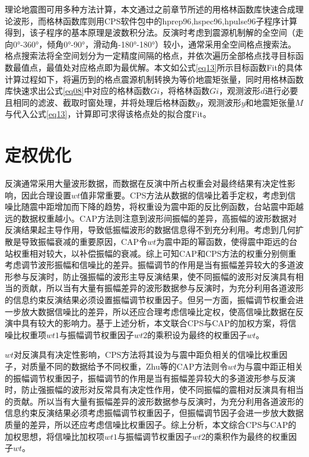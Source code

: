 理论地震图可用多种方法计算，本文通过之前章节所述的用格林函数库快速合成理论波形，而格林函数库则用CPS软件包中的hprep96,hspec96,hpulse96子程序计算得到，该子程序的基本原理是波数积分法。反演时考虑到震源机制解的全空间（走向0°-360°，倾角0°-90°，滑动角-180°-180°）较小，通常采用全空间格点搜索法。
格点搜索法将全空间划分为一定精度间隔的格点，并依次遍历全部格点找寻目标函数最值点，最值处对应格点即为最优解。本文如公式\ref{eq13}所示目标函数Fit的具体计算过程如下，将遍历到的格点震源机制转换为等价地震矩张量\citep{Jost1989}，同时用格林函数库快速求出公式\ref{eq08}中对应的格林函数$Gi$，将格林函数$Gi$，观测波形$d$进行必要且相同的滤波、截取时窗处理，并将处理后格林函数$g$，观测波形$y$和地震矩张量$M$与代入公式\ref{eq13}，计算即可求得该格点处的拟合度Fit。

\section{定权优化}
\label{sec:first}

反演通常采用大量波形数据，而数据在反演中所占权重会对最终结果有决定性影响，因此合理设置$wt$值非常重要。CPS方法从数据的信噪比着手定权，考虑到信噪比随震中距增加而下降的趋势，将权重设为震中距的反比例函数，台站震中距越远的数据权重越小。CAP方法\citep{Zhu1996}则注意到波形间振幅的差异，高振幅的波形数据对反演结果起主导作用，导致低振幅波形的数据信息得不到充分利用。考虑到几何扩散是导致振幅衰减的重要原因，CAP令$wt$为震中距的幂函数，使得震中距远的台站权重相对较大，以补偿振幅的衰减。综上可知CAP和CPS方法的权重分别侧重考虑调节波形振幅和信噪比的差异。振幅调节的作用是当有振幅差异较大的多道波形参与反演时，防止强振幅的波形主导反演结果，使不同振幅的波形对反演具有相当的贡献，所以当有大量有振幅差异的波形数据参与反演时，为充分利用各道波形的信息约束反演结果必须设置振幅调节权重因子。但另一方面，振幅调节权重会进一步放大数据信噪比的差异，所以还应合理考虑信噪比定权，使高信噪比数据在反演中具有较大的影响力。基于上述分析，本文联合CPS与CAP的加权方案，将信噪比权重项$wt1$与振幅调节权重因子$wt2$的乘积设为最终的权重因子$wt$。

$wt$对反演具有决定性影响，CPS方法将其设为与震中距负相关的信噪比权重因子，对质量不同的数据给予不同权重，Zhu等\citep{Zhu1996}的CAP方法则令$wt$为与震中距正相关的振幅调节权重因子，振幅调节的作用是当有振幅差异较大的多道波形参与反演时，防止强振幅的波形对反常具有决定性作用，使不同振幅的震相对反演具有相当的贡献。所以当有大量有振幅差异的波形数据参与反演时，为充分利用各道波形的信息约束反演结果必须考虑振幅调节权重因子，但振幅调节因子会进一步放大数据质量的差异，所以还应考虑信噪比权重因子。综上分析，本文综合CPS与CAP的加权思想，将信噪比加权项$wt1$与振幅调节权重因子$wt2$的乘积作为最终的权重因子$wt$。


